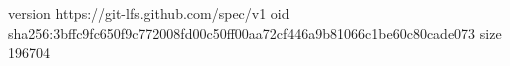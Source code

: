 version https://git-lfs.github.com/spec/v1
oid sha256:3bffc9fc650f9c772008fd00c50ff00aa72cf446a9b81066c1be60c80cade073
size 196704

